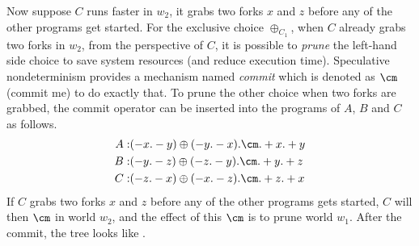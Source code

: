Now suppose $C$ runs faster in $w_2$, it grabs two forks $x$ and $z$ before any of the other programs get started.
For the exclusive choice $\oplus_{C_1}$, when $C$ already grabs two forks in $w_2$, from the perspective of $C$, 
it is possible to \emph{prune} the left-hand side choice to save system resources (and reduce execution time).
Speculative nondeterminism provides a mechanism named \emph{commit} 
which is denoted as $\cm$ (commit me) to do exactly that.
To prune the other choice when two forks are grabbed, 
the commit operator can be inserted into the programs of $A$, $B$ and $C$ as follows.
\begin{eqnarray*}
A: & (-x.-y)\oplus(-y.-x).\cm.+x.+y \label{eqn:a-cm}\\
B: & (-y.-z)\oplus(-z.-y).\cm.+y.+z \label{eqn:b-cm}\\
C: & (-z.-x)\oplus(-x.-z).\cm.+z.+x \label{eqn:c-cm}
\end{eqnarray*}
If $C$ grabs two forks $x$ and $z$ before any of the other programs gets started, $C$ will then $\cm$ in world $w_2$, and the effect of this $\cm$ is to prune world $w_1$.
After the commit, the tree looks like .
